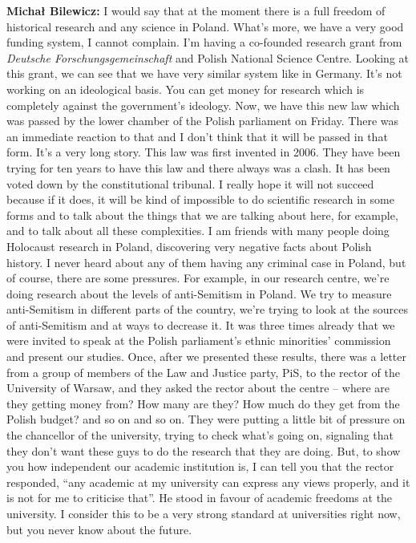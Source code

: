 \textbf{Michał Bilewicz:} I would say that at the moment there is a full freedom of historical research and any science in Poland. What’s more, we have a very good funding system, I cannot complain. I’m having a co-founded research grant from \textit{Deutsche Forschungsgemeinschaft} and Polish National Science Centre. Looking at this grant, we can see that we have very similar system like in Germany. It's not working on an ideological basis. You can get money for research which is completely against the government’s ideology. Now, we have this new law which was passed by the lower chamber of the Polish parliament on Friday. There was an immediate reaction to that and I don’t think that it will be passed in that form. It’s a very long story. This law was first invented in 2006. They have been trying for ten years to have this law and there always was a clash. It has been voted down by the constitutional tribunal. I really hope it will not succeed because if it does, it will be kind of impossible to do scientific research in some forms and to talk about the things that we are talking about here, for example, and to talk about all these complexities.
I am friends with many people doing Holocaust research in Poland, discovering very negative facts about Polish history. I never heard about any of them having any criminal case in Poland, but of course, there are some pressures. For example, in our research centre, we’re doing research about the levels of anti-Semitism in Poland. We try to measure anti-Semitism in different parts of the country, we're trying to look at the sources of anti-Semitism and at ways to decrease it. It was three times already that we were invited to speak at the Polish parliament’s ethnic minorities’ commission and present our studies. Once, after we presented these results, there was a letter from a group of members of the Law and Justice party, PiS, to the rector of the University of Warsaw, and they asked the rector about the centre – where are they getting money from? How many are they? How much do they get from the Polish budget? and so on and so on. They were putting a little bit of pressure on the chancellor of the university, trying to check what’s going on, signaling that they don’t want these guys to do the research that they are doing. But, to show you how independent our academic institution is, I can tell you that the rector responded, ``any academic at my university can express any views properly, and it is not for me to criticise that''. He stood in favour of academic freedoms at the university. I consider this to be a very strong standard at universities right now, but you never know about the future.

